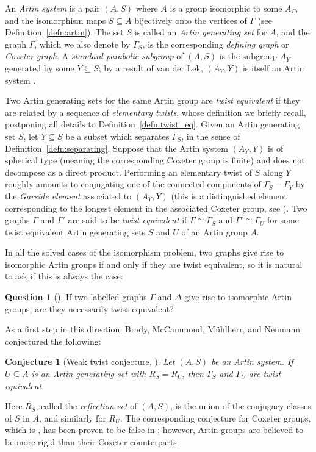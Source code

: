 \documentclass[svgnames]{amsart}
\theoremstyle{plain}
\newtheorem{conjintro}[thmintro]{Conjecture}
\theoremstyle{definition}
\newtheorem{question}[thmintro]{Question}
\begin{document}
An \emph{Artin system} is a pair $(A,S)$ where $A$ is a group isomorphic to some $A_\Gamma$, and the isomorphism maps $S\subseteq A$ bijectively onto the vertices of $\Gamma$ (see Definition~\ref{defn:artin}). The set $S$ is called an \emph{Artin generating set} for $A$, and the graph $\Gamma$, which we also denote by $\Gamma_S$, is the corresponding \emph{defining graph} or \emph{Coxeter graph}. A \emph{standard parabolic subgroup} of $(A,S)$ is the subgroup $A_Y$ generated by some $Y\subseteq S$; by a result of van der Lek, $(A_Y,Y)$ is itself an Artin system \cite{VanDerLek}.

Two Artin generating sets for the same Artin group are \emph{twist equivalent} if they are related by a sequence of \emph{elementary twists}, whose definition we briefly recall, postponing all details to Definition~\ref{defn:twist_eq}. Given an Artin generating set $S$, let $Y\subseteq S$ be a subset which separates $\Gamma_S$, in the sense of Definition~\ref{defn:separating}. Suppose that the Artin system $(A_Y,Y)$ is of spherical type (meaning the corresponding Coxeter group is finite) and does not decompose as a direct product. Performing an elementary twist of $S$ along $Y$ roughly amounts to conjugating one of the connected components of $\Gamma_S-\Gamma_Y$ by the \emph{Garside element} associated to $(A_Y,Y)$ (this is a distinguished element corresponding to the longest element in the associated Coxeter group, see \cite{BrieskornSaito}). Two graphs $\Gamma$ and $\Gamma'$ are said to be \emph{twist equivalent} if $\Gamma\cong \Gamma_S$ and $\Gamma'\cong\Gamma_U$ for some twist equivalent Artin generating sets $S$ and $U$ of an Artin group $A$.



 In all the solved cases of the isomorphism problem, two graphs give rise to isomorphic Artin groups if and only if they are twist equivalent, so it is natural to ask if this is always the case:

\begin{question}[{\cite[{Problem~28}]{charney2016problems}}]
    If two labelled graphs $\Gamma$ and $\Delta$ give rise to isomorphic Artin groups, are they necessarily twist equivalent?
\end{question}

As a first step in this direction, Brady, McCammond, M\"uhlherr, and Neumann conjectured the following:
\begin{conjintro}[{Weak twist conjecture, \cite[Conjecture 8.2]{BMMNtwistconjecture}}]\label{conjintro_WTC}
Let $(A, S)$ be an Artin system. If $U \subseteq A$ is an Artin generating set with $R_S=R_U$, then $\Gamma_S$ and $\Gamma_U$ are twist equivalent. 
\end{conjintro}
Here $R_S$, called the \emph{reflection set} of $(A,S)$, is the union of the conjugacy classes of $S$ in $A$, and similarly for $R_U$. The corresponding conjecture for Coxeter groups, which is \cite[Conjecture 8.1]{BMMNtwistconjecture}, has been proven to be false in \cite{RT_Cox_not_twisteq}; however, Artin groups are believed to be more rigid than their Coxeter counterparts. 
\end{document}

